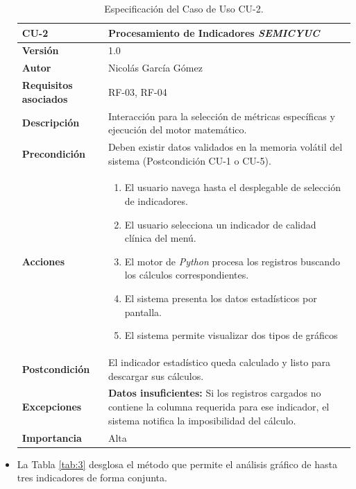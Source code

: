 \begin{itemize}
\begin{table}[hbt!]	\centering
	\begin{tabularx}{\linewidth}{ p{} p{} }
		\toprule
		\textbf{CU-2}    & \textbf{Procesamiento de Indicadores \textit{SEMICYUC}}\\
		\toprule
		\textbf{Versión}              & 1.0    \\
		\textbf{Autor}                & Nicolás García Gómez \\
		\textbf{Requisitos asociados} & RF-03, RF-04 \\
		\textbf{Descripción}          & Interacción para la selección de métricas específicas y ejecución del motor matemático. \\
		\textbf{Precondición}         & Deben existir datos validados en la memoria volátil del sistema (Postcondición CU-1 o CU-5). \\
		\textbf{Acciones}             &
		\begin{enumerate}
			\def\labelenumi{\arabic{enumi}.}
			\item El usuario navega hasta el desplegable de selección de indicadores.
			\item El usuario selecciona un indicador de calidad clínica del menú.
			\item El motor de \textit{Python} procesa los registros buscando los cálculos correspondientes.
			\item El sistema presenta los datos estadísticos por pantalla.
			\item El sistema permite visualizar dos tipos de gráficos
		\end{enumerate}\\
		\textbf{Postcondición}        & El indicador estadístico queda calculado y listo para descargar sus cálculos. \\
		\textbf{Excepciones}          & \textbf{Datos insuficientes:} Si los registros cargados no contiene la columna requerida para ese indicador, el sistema notifica la imposibilidad del cálculo. \\
		\textbf{Importancia}          & Alta \\
		\bottomrule
	\end{tabularx}
	\caption{Especificación del Caso de Uso CU-2.}
	\label{tab:2}
\end{table}	
	
	\item La Tabla \ref{tab:3} desglosa el método que permite el análisis gráfico de hasta tres indicadores de forma conjunta. 
	

\end{itemize}
